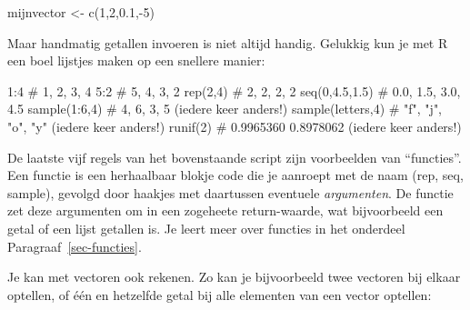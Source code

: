 \documentclass[
  b5paper,
  DIV=11,
  numbers=noendperiod]{scrreprt}
\newenvironment{Shaded}{\begin{snugshade}}{\end{snugshade}}
\newcommand{\CommentTok}[1]{\textcolor[rgb]{0.37,0.37,0.37}{#1}}
\newcommand{\DecValTok}[1]{\textcolor[rgb]{0.68,0.00,0.00}{#1}}
\newcommand{\FloatTok}[1]{\textcolor[rgb]{0.68,0.00,0.00}{#1}}
\newcommand{\FunctionTok}[1]{\textcolor[rgb]{0.28,0.35,0.67}{#1}}
\newcommand{\NormalTok}[1]{\textcolor[rgb]{0.00,0.23,0.31}{#1}}
\newcommand{\OtherTok}[1]{\textcolor[rgb]{0.00,0.23,0.31}{#1}}
\newcommand{\SpecialCharTok}[1]{\textcolor[rgb]{0.37,0.37,0.37}{#1}}
\theoremstyle{definition}
\theoremstyle{remark}
\begin{document}
\begin{Shaded}
\begin{Highlighting}[]
\NormalTok{mijnvector }\OtherTok{\textless{}{-}} \FunctionTok{c}\NormalTok{(}\DecValTok{1}\NormalTok{,}\DecValTok{2}\NormalTok{,}\FloatTok{0.1}\NormalTok{,}\SpecialCharTok{{-}}\DecValTok{5}\NormalTok{)}
\end{Highlighting}
\end{Shaded}

Maar handmatig getallen invoeren is niet altijd handig. Gelukkig kun je
met R een boel lijstjes maken op een snellere manier:

\begin{Shaded}
\begin{Highlighting}[]
\DecValTok{1}\SpecialCharTok{:}\DecValTok{4}                \CommentTok{\# 1, 2, 3, 4}
\DecValTok{5}\SpecialCharTok{:}\DecValTok{2}                \CommentTok{\# 5, 4, 3, 2}
\FunctionTok{rep}\NormalTok{(}\DecValTok{2}\NormalTok{,}\DecValTok{4}\NormalTok{)           }\CommentTok{\# 2, 2, 2, 2}
\FunctionTok{seq}\NormalTok{(}\DecValTok{0}\NormalTok{,}\FloatTok{4.5}\NormalTok{,}\FloatTok{1.5}\NormalTok{)     }\CommentTok{\# 0.0, 1.5, 3.0, 4.5}
\FunctionTok{sample}\NormalTok{(}\DecValTok{1}\SpecialCharTok{:}\DecValTok{6}\NormalTok{,}\DecValTok{4}\NormalTok{)      }\CommentTok{\# 4, 6, 3, 5 (iedere keer anders!)}
\FunctionTok{sample}\NormalTok{(letters,}\DecValTok{4}\NormalTok{)  }\CommentTok{\# "f", "j", "o", "y" (iedere keer anders!)}
\FunctionTok{runif}\NormalTok{(}\DecValTok{2}\NormalTok{)           }\CommentTok{\# 0.9965360 0.8978062 (iedere keer anders!)}
\end{Highlighting}
\end{Shaded}

De laatste vijf regels van het bovenstaande script zijn voorbeelden van
``functies''. Een functie is een herhaalbaar blokje code die je aanroept
met de naam (rep, seq, sample), gevolgd door haakjes met daartussen
eventuele \emph{argumenten}. De functie zet deze argumenten om in een
zogeheete return-waarde, wat bijvoorbeeld een getal of een lijst
getallen is. Je leert meer over functies in het onderdeel
Paragraaf~\ref{sec-functies}.

Je kan met vectoren ook rekenen. Zo kan je bijvoorbeeld twee vectoren
bij elkaar optellen, of één en hetzelfde getal bij alle elementen van
een vector optellen:
\end{document}
